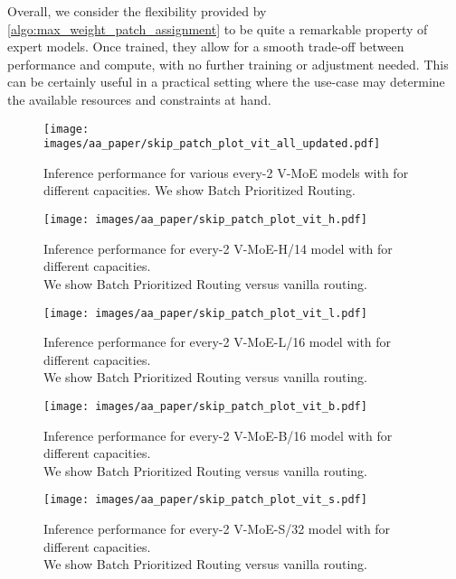 \documentclass{article}
\newcommand{\maxrouting}{Batch Prioritized Routing}
\begin{document}
Overall, we consider the flexibility provided by \cref{algo:max_weight_patch_assignment} to be quite a remarkable property of expert models.
Once trained, they allow for a smooth trade-off between performance and compute, with no further training or adjustment needed.
This can be certainly useful in a practical setting where the use-case may determine the available resources and constraints at hand.


\begin{figure}[h]
\centering
\texttt{[image: images/aa\_paper/skip\_patch\_plot\_vit\_all\_updated.pdf]}
\caption{Inference performance for various every-2 V-MoE models with  for different capacities.
We show \maxrouting{}.}
\label{im:inference_c_vit_all}
\end{figure}

\begin{figure}[h]
\centering
\texttt{[image: images/aa\_paper/skip\_patch\_plot\_vit\_h.pdf]}
\caption{Inference performance for every-2 V-MoE-H/14 model with  for different capacities. \\
We show \maxrouting{} versus vanilla routing.}
\label{im:inference_c_vit_h}
\end{figure}

\begin{figure}[h]
\centering
\texttt{[image: images/aa\_paper/skip\_patch\_plot\_vit\_l.pdf]}
\caption{Inference performance for every-2 V-MoE-L/16 model with  for different capacities. \\
We show \maxrouting{} versus vanilla routing.}
\label{im:inference_c_vit_l}
\end{figure}

\begin{figure}[h]
\centering
\texttt{[image: images/aa\_paper/skip\_patch\_plot\_vit\_b.pdf]}
\caption{Inference performance for every-2 V-MoE-B/16 model with  for different capacities. \\
We show \maxrouting{} versus vanilla routing.}
\label{im:inference_c_vit_b}
\end{figure}

\begin{figure}[h]
\centering
\texttt{[image: images/aa\_paper/skip\_patch\_plot\_vit\_s.pdf]}
\caption{Inference performance for every-2 V-MoE-S/32 model with  for different capacities. \\
We show \maxrouting{} versus vanilla routing.}
\label{im:inference_c_vit_s}
\end{figure}
\end{document}
